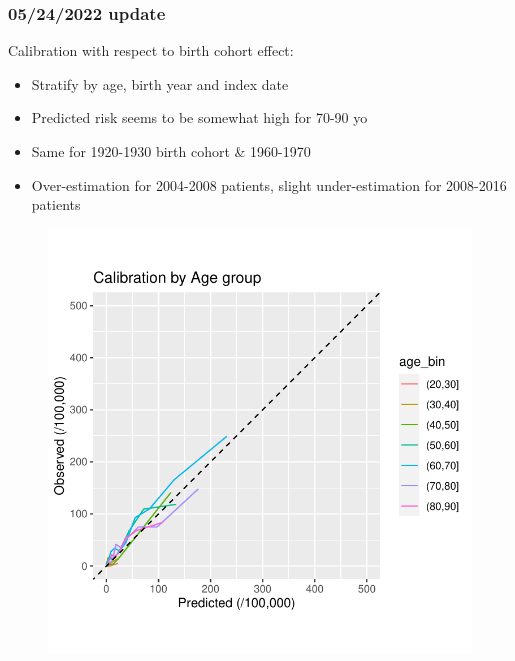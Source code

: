 \documentclass[12pt]{article}
\begin{document}
\clearpage
\pagebreak
\subsubsection*{05/24/2022 update}

Calibration with respect to birth cohort effect:
\begin{itemize}
	\item Stratify by age, birth year and index date	 
	\item Predicted risk seems to be somewhat high for 70-90 yo
	\item Same for 1920-1930 birth cohort \& 1960-1970
	\item Over-estimation for 2004-2008 patients, slight under-estimation for 2008-2016 patients
\end{itemize}



\begin{figure}[h]
\centering
\includegraphics[width=1.0\textwidth]{figures/birthyear/calibration_age_zoom.pdf}
\end{figure}
\end{document}
